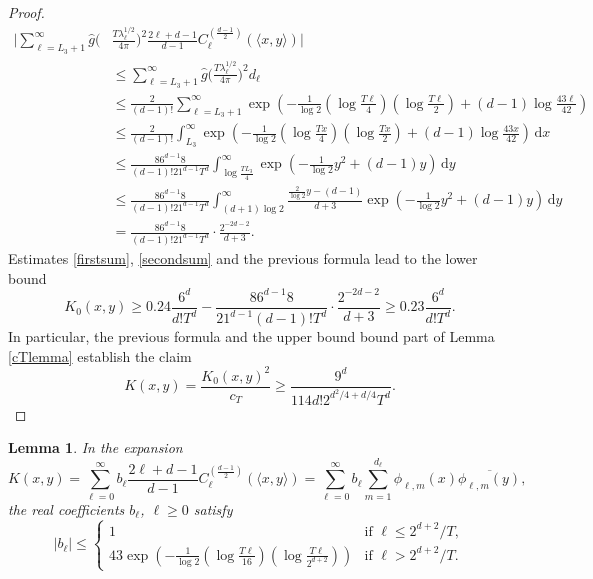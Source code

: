 \documentclass[11pt,a4paper]{article}
\newtheorem{lem}[thm]{Lemma}
\theoremstyle{definition}
\begin{document}
\begin{proof}
\[ \begin{split} \bigg| \sum_{\ell=L_3+1}^{\infty} \widehat{g}\bigg( &\frac{T \lambda_{\ell}^{1/2}}{4 \pi} \bigg)^2 \frac{2\ell+d-1}{d-1} C_{\ell}^{(\frac{d-1}{2})}(\langle x, y \rangle) \bigg| \\ &\le \sum_{\ell=L_3+1}^{\infty} \widehat{g}\bigg( \frac{T\lambda_{\ell}^{1/2}}{4 \pi} \bigg)^2 d_{\ell} \\ &\le \frac{2}{(d-1)!} \sum_{\ell=L_3+1}^{\infty} \exp \left( - \frac{1}{\log 2} \left( \log \frac{T \ell}{4} \right) \left( \log \frac{T \ell}{2} \right) + (d-1) \log \frac{43\ell}{42} \right) \\ &\le \frac{2}{(d-1)!} \int_{L_3}^{\infty} \exp \left( - \frac{1}{\log 2} \left( \log\frac{Tx}{4} \right) \left( \log \frac{Tx}{2} \right) + (d-1) \log \frac{43x}{42} \right) \, \mathrm{d}x \\ &\le \frac{86^{d-1} 8}{(d-1)! 21^{d-1} T^d} \int_{\log \frac{T L_3}{4}}^{\infty} \exp \left( - \frac{1}{\log 2} y^2 + (d-1) y \right) \, \mathrm{d}y \\ &\le \frac{86^{d-1}8}{(d-1)! 21^{d-1} T^d} \int_{(d+1) \log 2}^{\infty} \frac{\frac{2}{\log 2} y - (d-1)}{d+3} \exp \left( - \frac{1}{\log 2} y^2 + (d-1) y \right) \, \mathrm{d}y \\ &= \frac{86^{d-1} 8}{(d-1)! 21^{d-1} T^d} \cdot \frac{2^{-2d-2}}{d+3}. \end{split} \]
Estimates \eqref{firstsum}, \eqref{secondsum} and the previous formula lead to the lower bound
\[ K_0 (x,y) \ge 0.24 \frac{6^d}{d! T^d} - \frac{86^{d-1}8}{21^{d-1} (d-1)! T^d} \cdot \frac{2^{-2d-2}}{d+3} \ge 0.23 \frac{6^d}{d! T^d} . \]
In particular, the previous formula and the upper bound bound part of Lemma \ref{cTlemma} establish the claim
\[ K(x,y) = \frac{K_0(x,y)^2}{c_T} \ge \frac{9^d}{114 d! 2^{d^2/4+d/4} T^d} . \]
\end{proof}

\begin{lem}\label{belllemma} In the expansion
\[ K(x,y) = \sum_{\ell=0}^{\infty} b_{\ell} \frac{2\ell +d-1}{d-1} C_{\ell}^{(\frac{d-1}{2})}(\langle x,y \rangle) = \sum_{\ell=0}^{\infty} b_{\ell} \sum_{m=1}^{d_{\ell}} \phi_{\ell,m}(x) \overline{\phi_{\ell,m}(y)} , \]
the real coefficients $b_{\ell}$, $\ell \ge 0$ satisfy
\[ |b_{\ell}| \le \left\{ \begin{array}{ll} 1 & \textrm{if } \ell \le 2^{d+2}/T, \\ 43 \exp \left( - \frac{1}{\log 2} \left( \log \frac{T\ell}{16} \right) \left( \log \frac{T\ell}{2^{d+2}} \right) \right) & \textrm{if } \ell > 2^{d+2}/T . \end{array} \right. \]
\end{lem}
\end{document}
